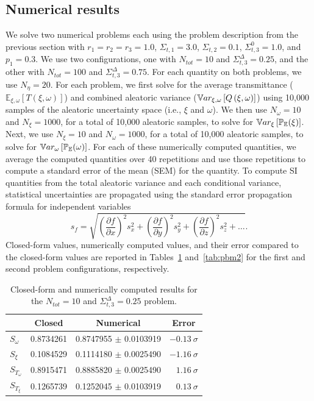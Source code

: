 \subsection{Numerical results}
We solve two numerical problems each using the problem description from the previous section with $r_1=r_2=r_3=1.0$, $\Sigma_{t,1}=3.0$, $\Sigma_{t,2}=0.1$, $\Sigma_{t,3}^0=1.0$, and $p_1=0.3$. We use two configurations, one with $N_{tot}=10$ and $\Sigma_{t,3}^\Delta=0.25$, and the other with $N_{tot}=100$ and $\Sigma_{t,3}^\Delta=0.75$.
For each quantity on both problems, we use $N_\eta=20$.
For each problem, we first solve for the average transmittance ($\mathbb{E}_{\xi,\omega}\left[T(\xi,\omega)\right]$) and combined aleatoric variance ($\mathbb{V}ar_{\xi,\omega}\left[Q\left(\xi,\omega\right)\right]$) using 10,000 samples of the aleatoric uncertainty space (i.e., $\xi$ and $\omega$).
We then use $N_\omega=10$ and $N_\xi=1000$, for a total of 10,000 aleatoric samples, to solve for $\mathbb{V}ar_\xi\left[ {\mathbb{P}_{\mathbb{E}}}(\xi) \right]$.
Next, we use $N_\xi=10$ and $N_\omega=1000$, for a total of 10,000 aleatoric samples, to solve for $\mathbb{V}ar_\omega\left[ {\mathbb{P}_{\mathbb{E}}}(\omega) \right]$.
For each of these numerically computed quantities, we average the computed quantities over 40 repetitions and use those repetitions to compute a standard error of the mean (SEM) for the quantity. To compute SI quantities from the total aleatoric variance and each conditional variance, statistical uncertainties are propagated using the standard error propagation formula for independent variables
\begin{equation}
s_f = \sqrt{  \left( \frac{\partial f}{\partial x} \right)^2 s_x^2 + \left( \frac{\partial f}{\partial y} \right)^2 s_y^2 + \left( \frac{\partial f}{\partial z} \right)^2 s_z^2 + \hdots}.
\end{equation}
\noindent Closed-form values, numerically computed values, and their error compared to the closed-form values are reported in Tables~\ref{tab:pbm1} and~\ref{tab:pbm2} for the first and second problem configurations, respectively. 
\begin{table}[htb]
    \centering
    \caption{Closed-form and numerically computed results for the $N_{tot}=10$ and $\Sigma_{t,3}^\Delta=0.25$ problem.}
    \begin{tabular}{|l||c|c|r|}\hline
    & \multicolumn{1}{|c|}{Closed} & Numerical & \multicolumn{1}{|c|}{Error}   \\ \hline \hline
    $S_\omega$      & 0.8734261  & 0.8747955 $\pm$ 0.0103919 & $-0.13~\sigma$   \\
    $S_\xi$         & 0.1084529  & 0.1114180 $\pm$ 0.0025490 & $-1.16~\sigma$   \\ \hline
    $S_{T_\omega}$  & 0.8915471  & 0.8885820 $\pm$ 0.0025490 & $1.16~\sigma$    \\
    $S_{T_\xi}$     & 0.1265739  & 0.1252045 $\pm$ 0.0103919 & $0.13~\sigma$    \\
    \hline
    \end{tabular}
\label{tab:pbm1}
\end{table}

